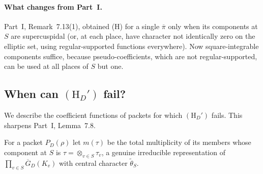 \documentclass[12pt]{article}
\newcommand{\ov}[1]{\overline{#1}}
\newcommand{\GDb}{\ov{G}_D}
\newcommand{\pib}{\ov{\pi}}
\theoremstyle{plain}
\theoremstyle{definition}
\begin{document}
\paragraph{What changes from Part~I.} Part~I, Remark~7.13(1), obtained (H) for a single $\pib$ only when its components at $S$ are supercuspidal (or, at each place, have character not identically zero on the elliptic set, using regular-supported functions everywhere). Now square-integrable components suffice, because pseudo-coefficients, which are not regular-supported, can be used at all places of $S$ but one.

\subsection{When can $(\mathrm H_D')$ fail?}\label{subsec:cancel2}
We describe the coefficient functions of packets for which $(\mathrm H_D')$ fails. This sharpens Part~I, Lemma~7.8.

For a packet $P_D(\rho)$ let $m(\tau)$ be the total multiplicity of its members whose component at $S$ is $\tau=\otimes_{v\in S}\tau_v$, a genuine irreducible representation of $\prod_{v\in S}\GDb(K_v)$ with central character $\tilde\theta_S$.
\end{document}
